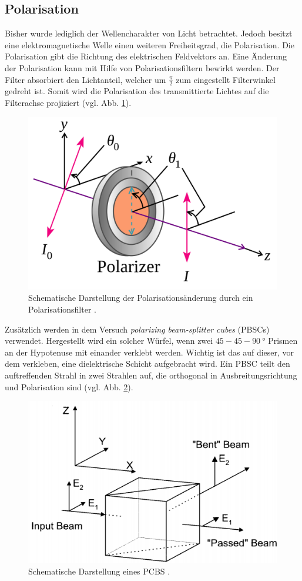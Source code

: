 \subsection{Polarisation}
Bisher wurde lediglich der Wellencharakter von Licht betrachtet. Jedoch besitzt eine
elektromagnetische Welle einen weiteren Freiheitsgrad, die Polarisation.
Die Polarisation gibt die Richtung des elektrischen Feldvektors an.
Eine Änderung der Polarisation kann mit Hilfe von Polarisationsfiltern bewirkt werden.
Der Filter absorbiert den Lichtanteil, welcher um $\frac{\pi}{2}$ zum eingestellt Filterwinkel
gedreht ist. Somit wird die Polarisation des transmittierte Lichtes auf die Filterachse projiziert (vgl. Abb. \ref{fig:pola}).
\begin{figure}
\centering
\includegraphics[width=0.5\linewidth]{./content/images/polarisationsfilter.png}
\caption{Schematische Darstellung der Polarisationsänderung durch ein Polarisationsfilter \cite{pola}.}
\label{fig:pola}
\end{figure}

Zusätzlich werden in dem Versuch \emph{polarizing beam-splitter cubes} (PBSCs) verwendet.
Hergestellt wird ein solcher Würfel, wenn zwei $45-45-\SI{90}{\degree}$ Prismen
an der Hypotenuse mit einander verklebt werden. Wichtig ist das auf dieser, vor dem verkleben,
eine dielektrische Schicht aufgebracht wird. Ein PBSC teilt den auftreffenden Strahl
in zwei Strahlen auf, die orthogonal in Ausbreitungsrichtung und Polarisation
sind (vgl. Abb. \ref{fig:pbsc}).
\begin{figure}
\centering
\includegraphics[width=0.6\linewidth]{./content/images/pbsc.png}
\caption{Schematische Darstellung eines PCBS \cite{anleitung64}.}
\label{fig:pbsc}
\end{figure}
